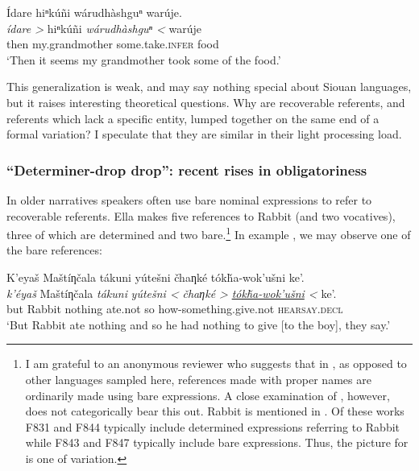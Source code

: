 \documentclass[output=paper]{LSP/langsci}
\begin{document}
\ea\label{wansigechemidrop}
Ídare hiⁿkúñi wárudhàshguⁿ warúje.\footnotemark\\
\gll	\emph{ídare >} 		hiⁿkúñi 				\emph{wárudhàshguⁿ <}	warúje\\
	then 				my.grandmother 			some.take.\textsc{infer}	food\\
\glt	`Then it seems my grandmother took some of the food.'
\z

This generalization is weak, and may say nothing special about Siouan languages, but it raises interesting theoretical questions. Why are recoverable referents, and referents which lack a specific entity, lumped together on the same end of a formal variation? I speculate that they are similar in their light processing load.

\subsubsection{“Determiner-drop drop”: recent rises in obligatoriness}\label{determinerdropdrop}

	In older  narratives speakers often use bare nominal expressions to refer to recoverable referents. Ella \citet[F831]{Deloria1932} makes five references to Rabbit (and two vocatives), three of which are determined and two bare.\footnote{I am grateful to an anonymous reviewer who suggests that in , as opposed to other languages sampled here, references made with proper names are ordinarily made using bare expressions. A close examination of \citet{Deloria1932}, however, does not categorically bear this out. Rabbit is mentioned in \citet[F831, F843, F844 and F847]{Deloria1932}. Of these works F831 and F844 typically include determined expressions referring to Rabbit while F843 and F847 typically include bare expressions. Thus, the picture for  is one of variation.} In example , we may observe one of the bare references:
	
\ea\label{deloriadrop}
	K’eyaš Maštíƞčala tákuni yútešni čhaƞké tókȟa-wok’ušni ke’.\footnotemark\\
\gll	\emph{k’éyaš} 	Maštíƞčala 	\emph{tákuni} 	\emph{yútešni <}	 \emph{čhaƞké >} 	\emph{\underline{tókȟa-wok’ušni} <}		ke’. \\
	but 			Rabbit		nothing	 	ate.not	 	 so 			 how-something.give.not 				\textsc{hearsay.decl}\\
\glt	`But Rabbit ate nothing and so he had nothing to give [to the boy], they say.'
\z
\end{document}

